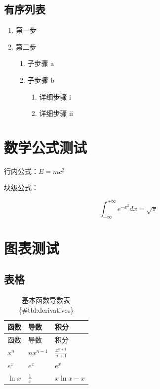 \documentclass[
  11pt,
  letterpaper,
  oneside,
  a4paper]{book}
\providecommand{\tightlist}{%
  \setlength{\itemsep}{0pt}\setlength{\parskip}{0pt}}
\numberwithin{equation}{chapter}
\theoremstyle{plain}
\theoremstyle{definition}
\theoremstyle{plain}
\theoremstyle{plain}
\theoremstyle{plain}
\theoremstyle{remark}
\begin{document}
\subsection{有序列表}\label{ux6709ux5e8fux5217ux8868}

\begin{enumerate}
\def\labelenumi{\arabic{enumi}.}
\tightlist
\item
  第一步
\item
  第二步

  \begin{enumerate}
  \def\labelenumii{\alph{enumii}.}
  \tightlist
  \item
    子步骤 a
  \item
    子步骤 b

    \begin{enumerate}
    \def\labelenumiii{\roman{enumiii}.}
    \tightlist
    \item
      详细步骤 i
    \item
      详细步骤 ii
    \end{enumerate}
  \end{enumerate}
\end{enumerate}

\section{数学公式测试}\label{ux6570ux5b66ux516cux5f0fux6d4bux8bd5}

行内公式：\(E = mc^2\)

块级公式：

\begin{equation} \int_{-\infty}^{+\infty} e^{-x^2} dx = \sqrt{\pi} \end{equation}

\section{图表测试}\label{ux56feux8868ux6d4bux8bd5}

\subsection{表格}\label{ux8868ux683c}

\begin{longtable}[]{@{}lll@{}}
\caption{基本函数导数表 \{\#tbl:derivatives\}}\tabularnewline
\toprule\noalign{}
函数 & 导数 & 积分 \\
\midrule\noalign{}
\endfirsthead
\toprule\noalign{}
函数 & 导数 & 积分 \\
\midrule\noalign{}
\endhead
\bottomrule\noalign{}
\endlastfoot
\(x^n\) & \(nx^{n-1}\) & \(\frac{x^{n+1}}{n+1}\) \\
\(e^x\) & \(e^x\) & \(e^x\) \\
\(\ln x\) & \(\frac{1}{x}\) & \(x\ln x - x\) \\
\end{longtable}
\end{document}
